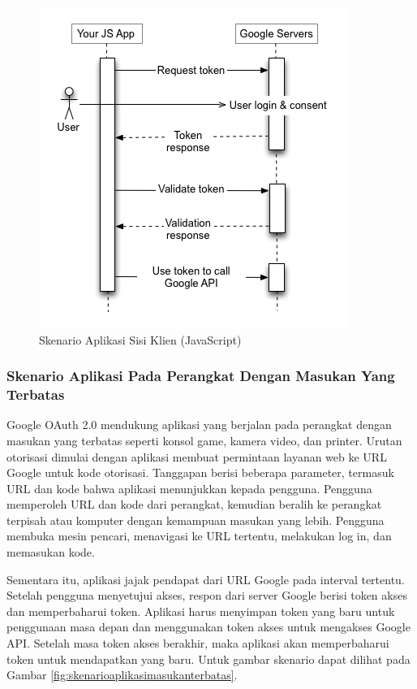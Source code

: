 \begin{figure}[H]
\centering
\includegraphics[scale=1]{Gambar/skenario2.png}
\caption[Gambar Skenario Aplikasi Sisi Klien (JavaScript)]{Skenario Aplikasi Sisi Klien (JavaScript)}
\label{fig:skenarioaplikasisisiklien}
\end{figure}

\subsubsection{Skenario Aplikasi Pada Perangkat Dengan Masukan Yang Terbatas}
Google OAuth 2.0 mendukung aplikasi yang berjalan pada perangkat dengan masukan yang terbatas seperti konsol game, kamera video, dan printer. Urutan otorisasi dimulai dengan aplikasi membuat permintaan layanan web ke URL Google untuk kode otorisasi. Tanggapan berisi beberapa parameter, termasuk URL dan kode bahwa aplikasi menunjukkan kepada pengguna. Pengguna memperoleh URL dan kode dari perangkat, kemudian beralih ke perangkat terpisah atau komputer dengan kemampuan masukan yang lebih. Pengguna membuka mesin pencari, menavigasi ke URL tertentu, melakukan log in, dan memasukan kode.

Sementara itu, aplikasi jajak pendapat dari URL Google pada interval tertentu. Setelah pengguna menyetujui akses, respon dari server Google berisi token akses dan memperbaharui token. Aplikasi harus menyimpan token yang baru untuk penggunaan masa depan dan menggunakan token akses untuk mengakses Google API. Setelah masa token akses berakhir, maka aplikasi akan memperbaharui token untuk mendapatkan yang baru. Untuk gambar skenario dapat dilihat pada Gambar \ref{fig:skenarioaplikasimasukanterbatas}.

